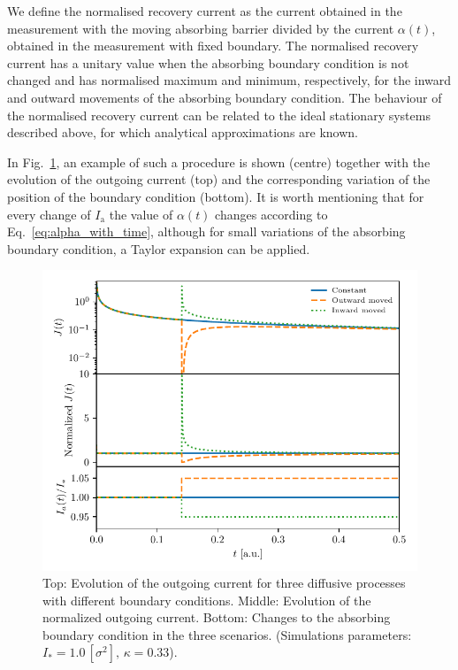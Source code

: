 We define the normalised recovery current as the current obtained in the measurement with the moving absorbing barrier divided by the current $\alpha(t)$, obtained in the measurement with fixed boundary. The normalised recovery current has a unitary value when the absorbing boundary condition is not changed and has normalised maximum and minimum, respectively, for the inward and outward movements of the absorbing boundary condition. The behaviour of the normalised recovery current can be related to the ideal stationary systems described above, for which analytical approximations are known.

In Fig.~\ref{fig:fixed-vs-moved-boundary}, an example of such a procedure is shown (centre) together with the evolution of the outgoing current (top) and the corresponding variation of the position of the boundary condition (bottom). It is worth mentioning that for every change of $I_\mathrm{a}$ the value of $\alpha(t)$ changes according to Eq.~\eqref{eq:alpha_with_time}, although for small variations of the absorbing boundary condition, a Taylor expansion can be applied.

\begin{figure}[htp]
    \centering
    \includegraphics[width=\textwidth]{4_probing_the_diffusive_behavior/figs/final/global_vs_moving_current.pdf}
    \caption{Top: Evolution of the outgoing current for three diffusive processes with different boundary conditions. Middle: Evolution of the normalized outgoing current. Bottom: Changes to the absorbing boundary condition in the three scenarios. (Simulations parameters: $I_\ast = 1.0\,[\sigma^2], \, \kappa = 0.33$).}
    \label{fig:fixed-vs-moved-boundary}
\end{figure}


